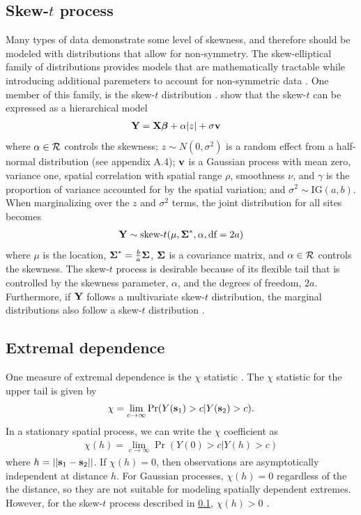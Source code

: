 \documentclass[11pt]{article}
\begin{document}
\subsection{Skew-$t$ process}\label{s:data}
Many types of data demonstrate some level of skewness, and therefore should be modeled with distributions that allow for non-symmetry.
The skew-elliptical family of distributions provides models that are mathematically tractable while introducing additional paremeters to account for non-symmetric data \citep{Genton2004}.
One member of this family, is the skew-$t$ distribution \citep[see Appendix A.5]{Azzalini2003}.
\citet{Zhang2010} show that the skew-$t$ can be expressed as a hierarchical model
\begin{align} \label{eq:fullmodel}
  \mbox{\bf Y} &= \mbox{\bf X} \mbox{\boldmath $\beta$} + \alpha |z| + \sigma \mbox{\bf v}
\end{align}
where $\alpha \in {\cal R}$ controls the skewness; $z \sim N(0, \sigma^2)$ is a random effect from a half-normal distribution (see appendix A.4); $\mbox{\bf v}$ is a Gaussian process with mean zero, variance one, \Matern spatial correlation with spatial range $\rho$, smoothness $\nu$, and $\gamma$ is the proportion of variance accounted for by the spatial variation; and $\sigma^2 \sim \text{IG}(a, b)$.
When marginalizing over the $z$ and $\sigma^2$ terms, the joint distribution for all sites becomes
\begin{align*}
  \mbox{\bf Y} \sim \text{skew-}t (\mu, \mbox{\boldmath $\Sigma$}^*, \alpha, \text{df} = 2a)
\end{align*}
where $\mu$ is the location, $\mbox{\boldmath $\Sigma$}^* = \frac{ b }{ a } \mbox{\boldmath $\Sigma$}$, $\mbox{\boldmath $\Sigma$}$ is a \Matern covariance matrix, and $\alpha \in {\cal R}$ controls the skewness.
The skew-$t$ process is desirable because of its flexible tail that is controlled by the skewness parameter, $\alpha$, and the degrees of freedom, $2a$.
Furthermore, if $\mbox{\bf Y}$ follows a multivariate skew-$t$ distribution, the marginal distributions also follow a skew-$t$ distribution \citep{Azzalini2003}.

\subsection{Extremal dependence}
One measure of extremal dependence is the $\chi$ statistic \citep{Padoan2011}.
The $\chi$ statistic for the upper tail is given by
\begin{align*}
  \chi = \lim_{c \rightarrow \infty} \Pr(Y(\mbox{\bf s}_1) > c | Y(\mbox{\bf s}_2) > c).
\end{align*}
In a stationary spatial process, we can write the $\chi$ coefficient as
\begin{align*}
  \chi(h) = \lim_{c \rightarrow \infty} \Pr(Y(0) > c | Y(h) > c)
\end{align*}
where $h = ||\mbox{\bf s}_1 - \mbox{\bf s}_2||$.
If $\chi(h) = 0$, then observations are asymptotically independent at distance $h$.
For Gaussian processes, $\chi(h) = 0$ regardless of the the distance, so they are not suitable for modeling spatially dependent extremes.
However, for the skew-$t$ process described in \ref{s:data}, $\chi(h) > 0$ \citep[see Appendix A.5 for the expression]{Padoan2011}.
\end{document}
